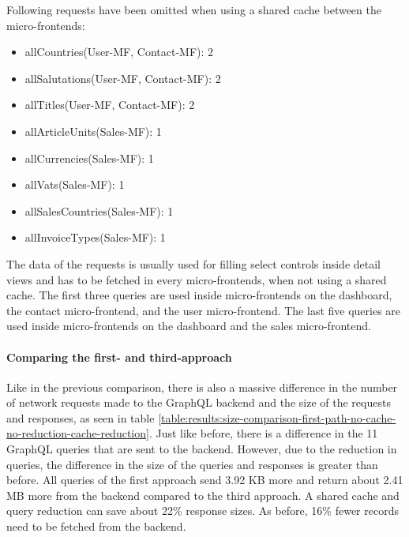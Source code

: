 \noindent Following requests have been omitted when using a shared cache between the micro-frontends:

\begin{itemize}\item allCountries(User-MF, Contact-MF): 2
  \item allSalutations(User-MF, Contact-MF): 2
  \item allTitles(User-MF, Contact-MF): 2
  \item allArticleUnits(Sales-MF): 1
  \item allCurrencies(Sales-MF): 1
  \item allVats(Sales-MF): 1
  \item allSalesCountries(Sales-MF): 1
  \item allInvoiceTypes(Sales-MF): 1
\end{itemize}

\noindent The data of the requests is usually used for filling select controls inside detail views and has to be fetched in every micro-frontends, when not using a shared cache. The first three queries are used inside micro-frontends on the dashboard, the contact micro-frontend, and the user micro-frontend. The last five queries are used inside micro-frontends on the dashboard and the sales micro-frontend.

\paragraph{Comparing the first- and third-approach}

Like in the previous comparison, there is also a massive difference in the number of network requests made to the GraphQL backend and the size of the requests and responses, as seen in table \ref{table:results:size-comparison-first-path-no-cache-no-reduction-cache-reduction}. Just like before, there is a difference in the 11 GraphQL queries that are sent to the backend. However, due to the reduction in queries, the difference in the size of the queries and responses is greater than before. All queries of the first approach send 3.92 KB more and return about 2.41 MB more from the backend compared to the third approach. A shared cache and query reduction can save about 22\% response sizes. As before, 16\% fewer records need to be fetched from the backend.

